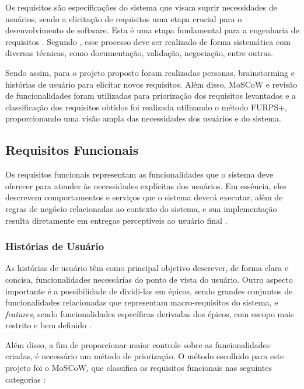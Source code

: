 

Os requisitos são especificações do sistema que visam suprir necessidades de usuários, sendo a elicitação de requisitos uma etapa crucial para o desenvolvimento de software. Esta é uma etapa fundamental para a engenharia de requisitos \cite{reinehr2020engenharia}. Segundo , esse processo deve ser realizado de forma sistemática com diversas técnicas, como documentação, validação, negociação, entre outras.

Sendo assim, para o projeto proposto foram realizadas personas, brainstorming e histórias de usuário para elicitar novos requisitos. Além disso, MoSCoW e revisão de funcionalidades foram utilizadas para priorização dos requisitos levantados e a classificação dos requisitos obtidos foi realizada utilizando o método FURPS+, proporcionando uma visão ampla das necessidades dos usuários e do sistema.

\subsection{Requisitos Funcionais}

Os requisitos funcionais representam as funcionalidades que o sistema deve oferecer para atender às necessidades explícitas dos usuários. Em essência, eles descrevem comportamentos e serviços que o sistema deverá executar, além de regras de negócio relacionadas ao contexto do sistema, e sua implementação resulta diretamente em entregas perceptíveis ao usuário final \cite{reinehr2020engenharia}.

\subsubsection{Histórias de Usuário}

As histórias de usuário têm como principal objetivo descrever, de forma clara e concisa, funcionalidades necessárias do ponto de vista do usuário. Outro aspecto importante é a possibilidade de dividi-las em épicos, sendo grandes conjuntos de funcionalidades relacionadas que representam macro-requisitos do sistema, e \textit{features}, sendo funcionalidades específicas derivadas dos épicos, com escopo mais restrito e bem definido \cite{reinehr2020engenharia}.

Além disso, a fim de proporcionar maior controle sobre as funcionalidades criadas, é necessário um método de priorização. O método escolhido para este projeto foi o MoSCoW, que classifica os requisitos funcionais nas seguintes categorias \cite{carvalho2021moscow}:

